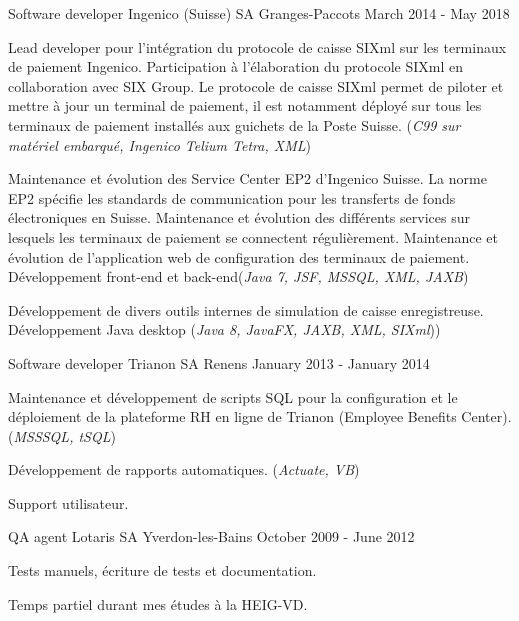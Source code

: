 \begin{cventries}
\cventry
{Software developer} %
{Ingenico (Suisse) SA} %
{Granges-Paccots} %
{March 2014 - May 2018} %
{ %
\begin{cvitems}
\item {Lead developer pour l'intégration du protocole de caisse SIXml sur les terminaux de paiement Ingenico. Participation à l'élaboration du protocole SIXml en collaboration avec SIX Group. Le protocole de caisse SIXml permet de piloter et mettre à jour un terminal de paiement, il est notamment déployé sur tous les terminaux de paiement installés aux guichets de la Poste Suisse. (\emph{C99 sur matériel embarqué, Ingenico Telium Tetra, XML})}
\item {Maintenance et évolution des Service Center EP2 d'Ingenico Suisse. La norme EP2 spécifie les standards de communication pour les transferts de fonds électroniques en Suisse. Maintenance et évolution des différents services sur lesquels les terminaux de paiement se connectent régulièrement. Maintenance et évolution de l'application web de configuration des terminaux de paiement. Développement front-end et back-end(\emph{Java 7, JSF, MSSQL, XML, JAXB})}
\item {Développement de divers outils internes de simulation de caisse enregistreuse. Développement Java desktop (\emph{Java 8, JavaFX, JAXB, XML, SIXml}))}
\end{cvitems}
}


\cventry
{Software developer} %
{Trianon SA} %
{Renens} %
{January 2013 - January 2014} %
{ %
\begin{cvitems}
\item {Maintenance et développement de scripts SQL pour la configuration et le déploiement de la plateforme RH en ligne de Trianon (Employee Benefits Center). (\emph{MSSSQL, tSQL})}
\item {Développement de rapports automatiques. (\emph{Actuate, VB})}
\item {Support utilisateur.}
\end{cvitems} 
}


\cventry
{QA agent} %
{Lotaris SA} %
{Yverdon-les-Bains} %
{October 2009 - June 2012} %
{ %
\begin{cvitems}
\item {Tests manuels, écriture de tests et documentation.}
\item {Temps partiel durant mes études à la HEIG-VD.}
\end{cvitems}
}


\end{cventries}
